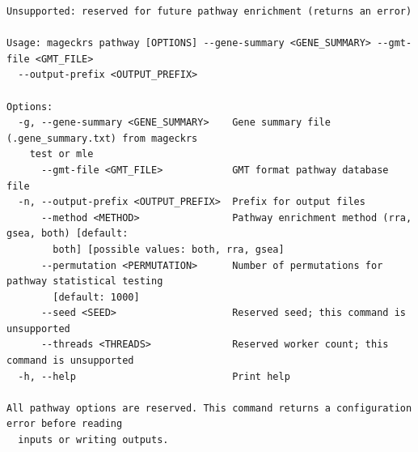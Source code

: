 \documentclass[11pt,a4paper]{article}
\begin{document}
\begin{verbatim}
Unsupported: reserved for future pathway enrichment (returns an error)

Usage: mageckrs pathway [OPTIONS] --gene-summary <GENE_SUMMARY> --gmt-file <GMT_FILE>
  --output-prefix <OUTPUT_PREFIX>

Options:
  -g, --gene-summary <GENE_SUMMARY>    Gene summary file (.gene_summary.txt) from mageckrs
    test or mle
      --gmt-file <GMT_FILE>            GMT format pathway database file
  -n, --output-prefix <OUTPUT_PREFIX>  Prefix for output files
      --method <METHOD>                Pathway enrichment method (rra, gsea, both) [default:
        both] [possible values: both, rra, gsea]
      --permutation <PERMUTATION>      Number of permutations for pathway statistical testing
        [default: 1000]
      --seed <SEED>                    Reserved seed; this command is unsupported
      --threads <THREADS>              Reserved worker count; this command is unsupported
  -h, --help                           Print help

All pathway options are reserved. This command returns a configuration error before reading
  inputs or writing outputs.
\end{verbatim}
\end{document}
